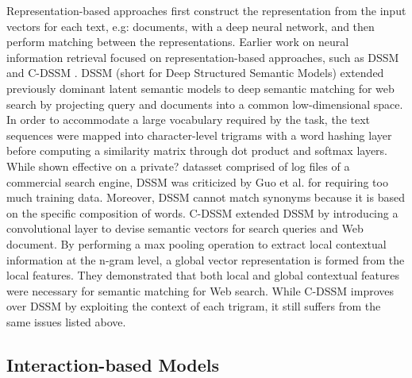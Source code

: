 Representation-based approaches first construct the representation from the input vectors for each text, e.g: documents, with a deep neural network, and then perform matching between the representations.
Earlier work on neural information retrieval focused on representation-based approaches, such as DSSM \cite{huang2013learning} and C-DSSM \cite{shen2014learning}.
DSSM (short for Deep Structured Semantic Models) \cite{huang2013learning} extended previously dominant latent semantic models to deep semantic matching for web search by projecting query and documents into a common low-dimensional space.
In order to accommodate a large vocabulary required by the task, the text sequences were mapped into character-level trigrams with a word hashing layer before computing a similarity matrix through dot product and softmax layers.
While shown effective on a private? datasset comprised of log files of a commercial search engine, DSSM was criticized by Guo et al. \cite{guo2017drmm} for requiring too much training data.
Moreover, DSSM cannot match synonyms because it is based on the specific composition of words.
C-DSSM \cite{shen2014learning} extended DSSM by introducing a convolutional layer to devise semantic vectors for search queries and Web document.
By performing a max pooling operation to extract local contextual information at the n-gram level, a global vector representation is formed from the local features.
They demonstrated that both local and global contextual features were necessary for semantic matching for Web search.
While C-DSSM improves over DSSM by exploiting the context of each trigram, it still suffers from the same issues listed above.

\subsection{Interaction-based Models}


